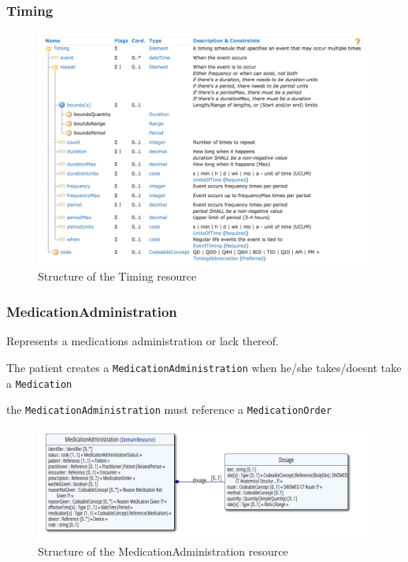 \documentclass{article}
\begin{document}
\subsubsection{Timing}\label{res:timing}
\begin{figure}[H]
\centering
\includegraphics[width=\linewidth]{resources/FHIR/DosageInstructions/Timing-Structure.png}
\caption{Structure of the Timing resource}
\label{fig:structure-timing}
\end{figure}


\subsubsection{MedicationAdministration}\label{res:medicationadministration}
Represents a medications administration or lack thereof.

The patient creates a \texttt{MedicationAdministration} when he/she takes/doesnt take a \texttt{Medication}

the \texttt{MedicationAdministration} must reference a
\texttt{MedicationOrder}

\begin{figure}[H]
\centering
\includegraphics[width=\linewidth]{resources/FHIR/MedicationAdministration/MedicationAdministration-UML.png}
\caption{Structure of the MedicationAdministration resource}
\label{fig:structure-medication-administration}
\end{figure}
\end{document}
